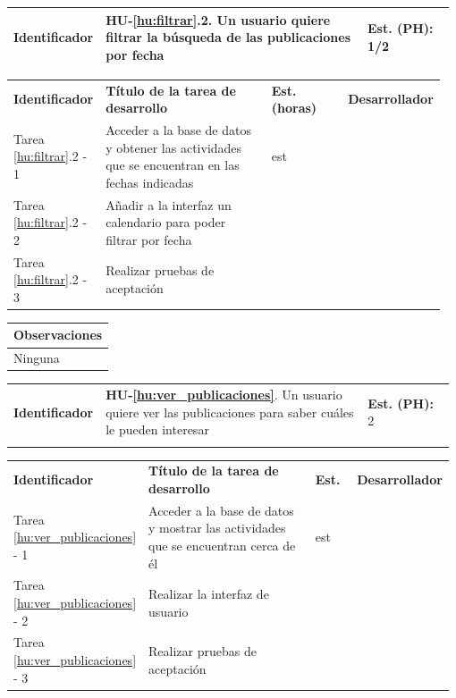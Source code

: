 \documentclass[11pt]{article}
\begin{document}
\centering
\begin{longtable}{p{0.18\linewidth}|p{0.6\linewidth}|p{0.2\linewidth}}
	\toprule
	\toprule
	\textbf{Identificador} & \textbf{HU-\ref{hu:filtrar}.2}. Un usuario quiere filtrar la búsqueda de las publicaciones por fecha & \textbf{Est. (PH):} 1/2 \\
	
	\bottomrule
\end{longtable}

\begin{longtable}{p{0.18\linewidth}|p{0.4\linewidth}|p{0.18\linewidth}|p{0.2\linewidth}}
	\toprule
	\textbf{Identificador} & \textbf{Título de la tarea de desarrollo} & \textbf{Est. (horas)} & \textbf{Desarrollador} \\
        Tarea \ref{hu:filtrar}.2 - 1 & Acceder a la base de datos y obtener las actividades que se encuentran en las fechas indicadas & est & \\
        Tarea \ref{hu:filtrar}.2 - 2 & Añadir a la interfaz un calendario para poder filtrar por fecha & \\
        Tarea \ref{hu:filtrar}.2 - 3 & Realizar pruebas de aceptación & \\
	\bottomrule
\end{longtable}

\begin{longtable}{p{1.028\linewidth}}
	\textbf{Observaciones}\\
	\midrule
	Ninguna\\
	\bottomrule
	\bottomrule
\end{longtable}

\centering
\begin{longtable}{p{0.18\linewidth}|p{0.6\linewidth}|p{0.2\linewidth}}
	\toprule
	\toprule
	\textbf{Identificador} & \textbf{HU-\ref{hu:ver_publicaciones}}. Un usuario quiere ver las publicaciones para saber cuáles le pueden interesar & \textbf{Est. (PH):} 2\\ \\
	
	\bottomrule
\end{longtable}

\begin{longtable}{p{0.18\linewidth}|p{0.5\linewidth}|p{0.1\linewidth}|p{0.2\linewidth}}
	\toprule
	\textbf{Identificador} & \textbf{Título de la tarea de desarrollo} & \textbf{Est.} & \textbf{Desarrollador} \\
        Tarea \ref{hu:ver_publicaciones} - 1 & Acceder  a la base de datos y mostrar las actividades que se encuentran cerca de él & est & \\
        Tarea \ref{hu:ver_publicaciones} - 2 & Realizar la interfaz de usuario & \\
        Tarea \ref{hu:ver_publicaciones} - 3 & Realizar pruebas de aceptación & \\
	\bottomrule
\end{longtable}
\end{document}
